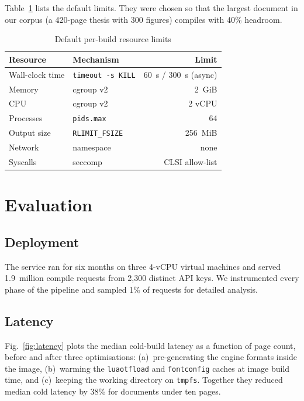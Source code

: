 \documentclass[journal]{IEEEtran}
\begin{document}
Table~\ref{tab:limits} lists the default limits. They were chosen so that
the largest document in our corpus (a 420-page thesis with 300 figures)
compiles with 40\% headroom.

\begin{table}[!t]
  \caption{Default per-build resource limits}
  \label{tab:limits}
  \centering
  \begin{tabular}{@{}llr@{}}
    \toprule
    Resource & Mechanism & Limit \\
    \midrule
    Wall-clock time & \texttt{timeout -s KILL} & 60~s / 300~s (async) \\
    Memory & cgroup v2 & 2~GiB \\
    CPU & cgroup v2 & 2 vCPU \\
    Processes & \texttt{pids.max} & 64 \\
    Output size & \texttt{RLIMIT\_FSIZE} & 256~MiB \\
    Network & namespace & none \\
    Syscalls & seccomp & CLSI allow-list \\
    \bottomrule
  \end{tabular}
\end{table}

\section{Evaluation}
\label{sec:eval}

\subsection{Deployment}
The service ran for six months on three 4-vCPU virtual machines and served
1.9~million compile requests from 2{,}300 distinct API keys. We instrumented
every phase of the pipeline and sampled 1\% of requests for detailed
analysis.

\subsection{Latency}
Fig.~\ref{fig:latency} plots the median cold-build latency as a function of
page count, before and after three optimisations: (a)~pre-generating the
engine formats inside the image, (b)~warming the \texttt{luaotfload} and
\texttt{fontconfig} caches at image build time, and (c)~keeping the working
directory on \texttt{tmpfs}. Together they reduced median cold latency by
38\% for documents under ten pages.
\end{document}
